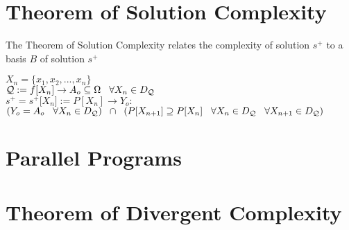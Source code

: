 \documentclass[11pt]{article}
\begin{document}
\section{Theorem of Solution Complexity}
The Theorem of Solution Complexity relates the complexity of solution $s^+$ to a basis $B$ of solution $s^+$
\begin{center}
\vspace{2mm}
$
X_n = \{x_1,x_2,...,x_n\}
$
\\ \vspace{4mm}
$
\mathcal{Q} := f \lbrack X_n \rbrack \rightarrow A_o \subseteq \Omega \hspace{3mm}\forall X_n \in D_{\mathcal{Q}}
$
\\ \vspace{4mm}
$
s^+ = s^+\lbrack X_n \rbrack := P[X_n] \rightarrow Y_o :
$
\\ \vspace{2mm}
$
(Y_o = A_o \hspace{3mm} \forall X_n \in D_{\mathcal{Q}}) \hspace{2mm} \cap \hspace{2mm} (P[X_{n+1}] \supseteq P[X_n] \hspace{3mm} \forall X_{n} \in D_{\mathcal{Q}} \hspace{3mm} \forall X_{n+1} \in D_{\mathcal{Q}})
$
\end{center}



\newpage
\section{Parallel Programs}





\newpage
\section{Theorem of Divergent Complexity}







%
\end{document}
